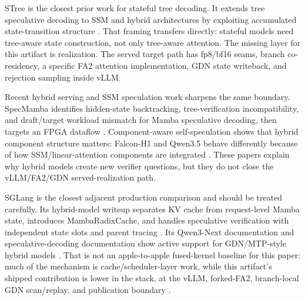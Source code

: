 \documentclass[conference]{IEEEtran}
\begin{document}
STree is the closest prior work for stateful tree decoding. It extends tree speculative decoding to SSM and hybrid architectures by exploiting accumulated state-transition structure \cite{wu2025stree}. That framing transfers directly: stateful models need tree-aware state construction, not only tree-aware attention. The missing layer for this artifact is realization. The served target path has fp8/bf16 seams, branch co-residency, a specific FA2 attention implementation, GDN state writeback, and rejection sampling inside vLLM.

Recent hybrid serving and SSM speculation work sharpens the same boundary. SpecMamba identifies hidden-state backtracking, tree-verification incompatibility, and draft/target workload mismatch for Mamba speculative decoding, then targets an FPGA dataflow \cite{zhong2025specmamba}. Component-aware self-speculation shows that hybrid component structure matters: Falcon-H1 and Qwen3.5 behave differently because of how SSM/linear-attention components are integrated \cite{borobia2026component}. These papers explain why hybrid models create new verifier questions, but they do not close the vLLM/FA2/GDN served-realization path.

SGLang is the closest adjacent production comparison and should be treated carefully. Its hybrid-model writeup separates KV cache from request-level Mamba state, introduces MambaRadixCache, and handles speculative verification with independent state slots and parent tracing \cite{pytorch2025sglang}. Its Qwen3-Next documentation and speculative-decoding documentation show active support for GDN/MTP-style hybrid models \cite{sglang2026qwen,sglang2026specdocs}. That is not an apple-to-apple fused-kernel baseline for this paper: much of the mechanism is cache/scheduler-layer work, while this artifact's shipped contribution is lower in the stack, at the vLLM, forked-FA2, branch-local GDN scan/replay, and publication boundary \cite{sglang2026issue25587,lumo2026receipts}.
\end{document}
